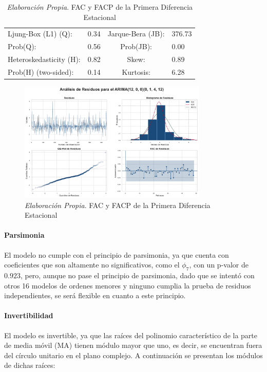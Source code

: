 \documentclass[12pt,letterpaper]{article}   %
\begin{document}
\begin{table}[htbp]
\vspace{0.3cm}

\begin{tabular}{llcl}
\toprule
Ljung-Box (L1) (Q): & 0.34 & Jarque-Bera (JB): & 376.73 \\
Prob(Q): & 0.56 & Prob(JB): & 0.00 \\
Heteroskedasticity (H): & 0.82 & Skew: & 0.89 \\
Prob(H) (two-sided): & 0.14 & Kurtosis: & 6.28 \\
\bottomrule
\end{tabular}


\begin{figure}[h]
    \centering
    \includegraphics[width=0.8\textwidth]{imagenes/04-01-analisis-de-residuos-m1.pdf}
    \caption{\textit{Elaboración Propia}. FAC y FACP de la Primera Diferencia Estacional}
\end{figure}


\end{table}





\paragraph{Parsimonia}
El modelo no cumple con el principio de parsimonia, ya que cuenta con coeficientes que son altamente no significativos, como el $\phi_7$, con un p-valor de $0.923$, pero, aunque no pase el principio de parsimonia, dado que se intentó con otros 16 modelos de ordenes menores y ninguno cumplia la prueba de residuos independientes, se será flexible en cuanto a este principio.

\paragraph{Invertibilidad}  
El modelo es invertible, ya que las raíces del polinomio característico de la parte de media móvil (MA) tienen módulo mayor que uno, es decir, se encuentran fuera del círculo unitario en el plano complejo. A continuación se presentan los módulos de dichas raíces:
\end{document}

